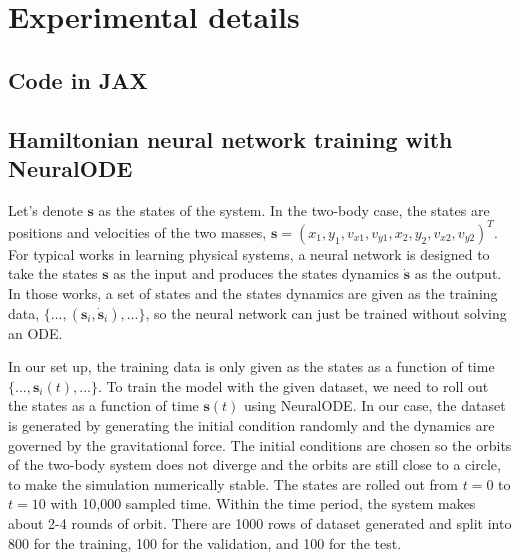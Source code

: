 \section{Experimental details}

\subsection{Code in JAX}
\label{appsubsec:code-in-jax}





\subsection{Hamiltonian neural network training with NeuralODE}
\label{appsec:hnn-training-details}

Let's denote $\mathbf{s}$ as the states of the system.
In the two-body case, the states are positions and velocities of the two masses, $\mathbf{s} = (x_1, y_1, v_{x1}, v_{y1}, x_2, y_2, v_{x2}, v_{y2})^T$.
For typical works in learning physical systems, a neural network is designed to take the states $\mathbf{s}$ as the input and produces the states dynamics $\mathbf{\dot{s}}$ as the output.
In those works, a set of states and the states dynamics are given as the training data, $\{..., (\mathbf{s}_i, \mathbf{\dot{s}}_i), ...\}$, so the neural network can just be trained without solving an ODE.

In our set up, the training data is only given as the states as a function of time $\{..., \mathbf{s}_i(t), ...\}$.
To train the model with the given dataset, we need to roll out the states as a function of time $\mathbf{s}(t)$ using NeuralODE.
In our case, the dataset is generated by generating the initial condition randomly and the dynamics are governed by the gravitational force.
The initial conditions are chosen so the orbits of the two-body system does not diverge and the orbits are still close to a circle, to make the simulation numerically stable.
The states are rolled out from $t=0$ to $t=10$ with 10,000 sampled time.
Within the time period, the system makes about 2-4 rounds of orbit.
There are 1000 rows of dataset generated and split into 800 for the training, 100 for the validation, and 100 for the test.

